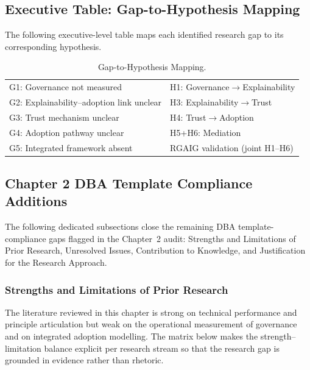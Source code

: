 \subsection{Executive Table: Gap-to-Hypothesis Mapping}
\label{sec:exec_gap_to_hypothesis}

\noindent The following executive-level table maps each identified research gap to its corresponding hypothesis.

{\tablestripes\tablefontsize
{}
\begin{xltabular}{\textwidth}{@{} >{\raggedright\arraybackslash}p{6cm} L @{}}
\caption[Gap-to-Hypothesis Mapping]{Gap-to-Hypothesis Mapping.}\label{tab:exec_gap_to_hypothesis} \\
\toprule
{} &  \\
\midrule
\endfirsthead
\endhead
\bottomrule
\endlastfoot
G1: Governance not measured & H1: Governance$\rightarrow$Explainability \\
\addlinespace
G2: Explainability--adoption link unclear & H3: Explainability$\rightarrow$Trust \\
\addlinespace
G3: Trust mechanism unclear & H4: Trust$\rightarrow$Adoption \\
\addlinespace
G4: Adoption pathway unclear & H5+H6: Mediation \\
\addlinespace
G5: Integrated framework absent & RGAIG validation (joint H1--H6) \\
\end{xltabular}}


\subsection{Chapter 2 DBA Template Compliance Additions}
\label{sec:ch2_template_compliance}

\noindent The following dedicated subsections close the remaining DBA template-compliance gaps flagged in the Chapter~2 audit: Strengths and Limitations of Prior Research, Unresolved Issues, Contribution to Knowledge, and Justification for the Research Approach.

\subsubsection{Strengths and Limitations of Prior Research}
\label{sec:ch2_strengths_limitations}

\noindent The literature reviewed in this chapter is strong on technical performance and principle articulation but weak on the operational measurement of governance and on integrated adoption modelling. The matrix below makes the strength--limitation balance explicit per research stream so that the research gap is grounded in evidence rather than rhetoric.

